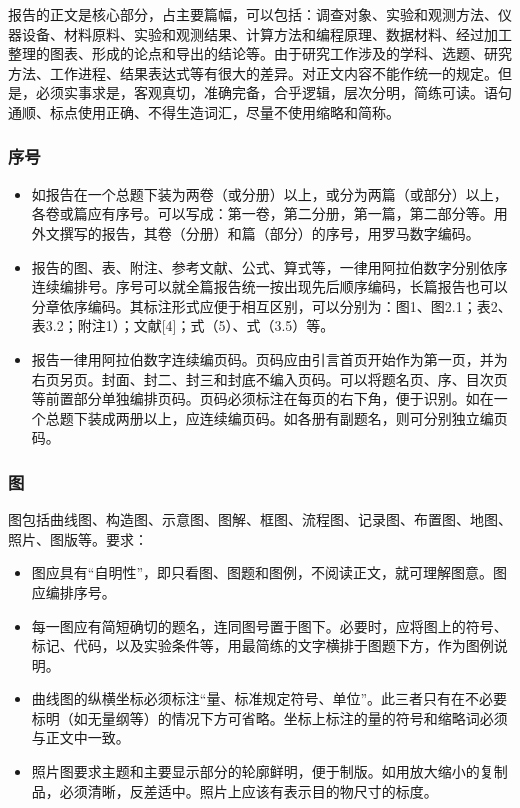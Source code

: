 报告的正文是核心部分，占主要篇幅，可以包括：调查对象、实验和观测方法、仪器设备、材料原料、实验和观测结果、计算方法和编程原理、数据材料、经过加工整理的图表、形成的论点和导出的结论等。由于研究工作涉及的学科、选题、研究方法、工作进程、结果表达式等有很大的差异。对正文内容不能作统一的规定。但是，必须实事求是，客观真切，准确完备，合乎逻辑，层次分明，简练可读。语句通顺、标点使用正确、不得生造词汇，尽量不使用缩略和简称。

\subsubsection{序号}

\begin{itemize}[leftmargin=2em]
    \item[a.] 如报告在一个总题下装为两卷（或分册）以上，或分为两篇（或部分）以上，各卷或篇应有序号。可以写成：第一卷，第二分册，第一篇，第二部分等。用外文撰写的报告，其卷（分册）和篇（部分）的序号，用罗马数字编码。
    \item[b.] 报告的图、表、附注、参考文献、公式、算式等，一律用阿拉伯数字分别依序连续编排号。序号可以就全篇报告统一按出现先后顺序编码，长篇报告也可以分章依序编码。其标注形式应便于相互区别，可以分别为：图1、图2.1；表2、表3.2；附注1）；文献[4]；式（5）、式（3.5）等。
    \item[c.] 报告一律用阿拉伯数字连续编页码。页码应由引言首页开始作为第一页，并为右页另页。封面、封二、封三和封底不编入页码。可以将题名页、序、目次页等前置部分单独编排页码。页码必须标注在每页的右下角，便于识别。如在一个总题下装成两册以上，应连续编页码。如各册有副题名，则可分别独立编页码。
\end{itemize}

\subsubsection{图}

图包括曲线图、构造图、示意图、图解、框图、流程图、记录图、布置图、地图、照片、图版等。要求：

\begin{itemize}[leftmargin=2em]
    \item[a.] 图应具有``自明性''，即只看图、图题和图例，不阅读正文，就可理解图意。图应编排序号。
    \item[b.] 每一图应有简短确切的题名，连同图号置于图下。必要时，应将图上的符号、标记、代码，以及实验条件等，用最简练的文字横排于图题下方，作为图例说明。
    \item[c.] 曲线图的纵横坐标必须标注``量、标准规定符号、单位''。此三者只有在不必要标明（如无量纲等）的情况下方可省略。坐标上标注的量的符号和缩略词必须与正文中一致。
    \item[d.] 照片图要求主题和主要显示部分的轮廓鲜明，便于制版。如用放大缩小的复制品，必须清晰，反差适中。照片上应该有表示目的物尺寸的标度。
\end{itemize}

